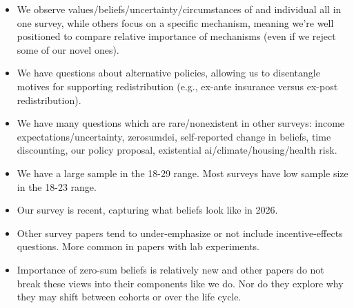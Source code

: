 \documentclass{article}
\begin{document}
\begin{itemize}
    \item We observe values/beliefs/uncertainty/circumstances of and individual all in one survey, while others focus on a specific mechanism, meaning we're well positioned to compare relative importance of mechanisms (even if we reject some of our novel ones). 
    \item We have questions about alternative policies, allowing us to disentangle motives for supporting redistribution (e.g., ex-ante insurance versus ex-post redistribution).
    \item We have many questions which are rare/nonexistent in other surveys: income expectations/uncertainty, zerosumdei, self-reported change in beliefs, time discounting, our policy proposal, existential ai/climate/housing/health risk.
    \item We have a large sample in the 18-29 range. Most surveys have low sample size in the 18-23 range. 
    \item Our survey is recent, capturing what beliefs look like in 2026.
    \item Other survey papers tend to under-emphasize or not include incentive-effects questions. More common in papers with lab experiments.
    \item Importance of zero-sum beliefs is relatively new and other papers do not break these views into their components like we do. Nor do they explore why they may shift between cohorts or over the life cycle. 
\end{itemize}
\end{document}
